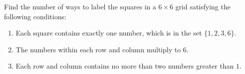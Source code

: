 Find the number of ways to label the squares in a $6\times 6$ grid satisfying the following conditions:

\begin{enumerate}

\item Each square contains exactly one number, which is in the set $\{1,2,3,6\}$.

\item The numbers within each row and column multiply to $6$.

\item Each row and column contains no more than two numbers greater than $1$.

\end{enumerate}
